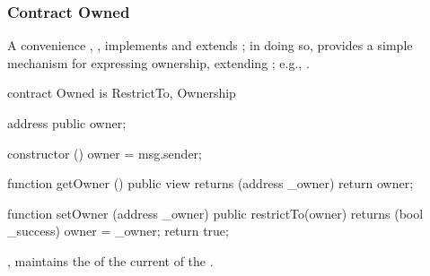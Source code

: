 \subsubsection{Contract Owned}

A convenience , , implements
 and extends ; in doing so,
 provides a simple mechanism for expressing 
ownership, extending ; e.g., .


\begin{solidity}
contract Owned is RestrictTo, Ownership {
  address public owner;

  constructor () {
    owner = msg.sender;
  }

  function getOwner () public view returns (address _owner) {
    return owner;
  }

  function setOwner (address _owner) public restrictTo(owner) returns (bool _success) {
    owner = _owner;
    return true;
  }
}
\end{solidity}

\begin{state}
  \item \attributes

  \begin{public}
    \item {}, maintains the  of the current
       of the .
  \end{public}
\end{state}

